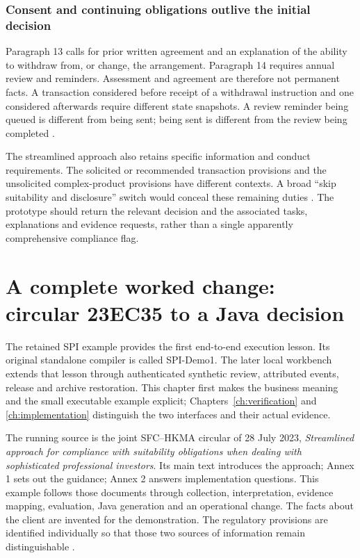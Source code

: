 \documentclass[12pt,a4paper,oneside,openany]{book}
\newcommand{\caseheading}[1]{\subsubsection*{#1}}
\begin{document}
\caseheading{Consent and continuing obligations outlive the initial decision}
Paragraph 13 calls for prior written agreement and an explanation of the ability
to withdraw from, or change, the arrangement. Paragraph 14 requires annual review
and reminders. Assessment and agreement are therefore not permanent facts. A
transaction considered before receipt of a withdrawal instruction and one
considered afterwards require different state snapshots. A review reminder being
queued is different from being sent; being sent is different from the review
being completed \citep[Annex 1, paras.~12--14]{sfcspiannex1}.

The streamlined approach also retains specific information and conduct
requirements. The solicited or recommended transaction provisions and the
unsolicited complex-product provisions have different contexts. A broad
``skip suitability and disclosure'' switch would conceal these remaining duties
\citep[Annex 1, paras.~9--11]{sfcspiannex1}. The prototype should return the
relevant decision and the associated tasks, explanations and evidence requests,
rather than a single apparently comprehensive compliance flag.

\section{A complete worked change: circular 23EC35 to a Java decision}

The retained SPI example provides the first end-to-end execution lesson.
Its original standalone compiler is called SPI-Demo1. The later local workbench
extends that lesson through authenticated synthetic review, attributed events,
release and archive restoration. This chapter first makes the business meaning
and the small executable example explicit; Chapters~\ref{ch:verification} and
\ref{ch:implementation} distinguish the two interfaces and their actual evidence.


\label{merge:P-01b-complete-dry-run:00}

\label{sec:dry-run}

The running source is the joint SFC--HKMA circular of 28 July 2023,
\emph{Streamlined approach for compliance with suitability obligations when
dealing with sophisticated professional investors}. Its main text introduces
the approach; Annex 1 sets out the guidance; Annex 2 answers implementation
questions. This example follows those documents through collection,
interpretation, evidence mapping, evaluation, Java generation and an operational
change. The facts about the client are invented for the demonstration. The
regulatory provisions are identified individually so that those two sources of
information remain distinguishable \citep{sfcspi,sfcspiannex1,sfcspiannex2}.
\end{document}
